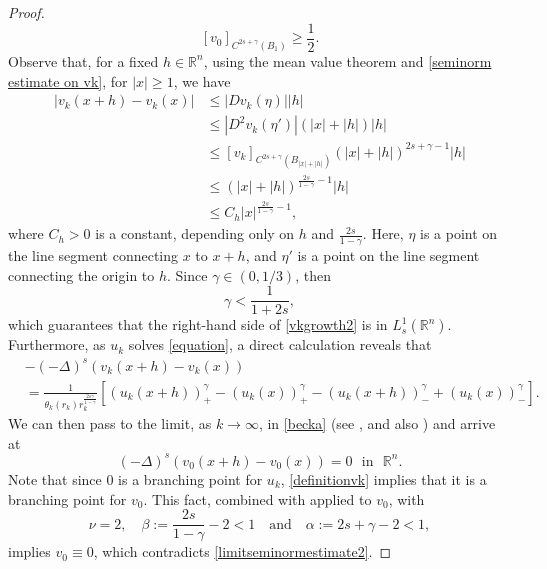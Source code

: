 \documentclass[11pt,reqno]{amsart}
\numberwithin{equation}{section}
\numberwithin{theorem}{section}
\numberwithin{lemma}{section}
\numberwithin{corollary}{section}
\numberwithin{remark}{section}
\numberwithin{proposition}{section}
\numberwithin{definition}{section}
\newcommand{\R}{\mathbb{R}}
\begin{document}
\begin{proof}
\begin{equation}\label{limitseminormestimate2}
     \left[v_0\right]_{C^{2s+\gamma}(B_{1})}\ge\frac{1}{2}.
\end{equation}
Observe that, for a fixed $h\in\R^n$, using the mean value theorem and \eqref{seminorm estimate on vk}, for  $|x|\ge1$, we have
\begin{equation}\label{vkgrowth2}
    \begin{split}
    |v_k(x+h)-v_k(x)|&\le|Dv_k(\eta)||h|\\
    &\le|D^2v_k(\eta')|(|x|+|h|)|h|\\
    &\le[v_k]_{C^{2s+\gamma}(B_{|x|+|h|})}(|x|+|h|)^{2s+\gamma-1}|h|\\
     &\le (|x|+|h|)^{\frac{2s}{1-\gamma}-1}|h|\\
     &\le C_h|x|^{\frac{2s}{1-\gamma}-1},
    \end{split}
\end{equation}
where $C_h>0$ is a constant, depending only on $h$ and $\frac{2s}{1-\gamma}$. Here, $\eta$ is a point on the line segment connecting $x$ to $x+h$, and $\eta'$ is a point on the line segment connecting the origin to $h$. Since $\gamma\in(0,1/3)$, then
$$
\gamma<\frac{1}{1+2s},
$$
which guarantees that the right-hand side of \eqref{vkgrowth2} is in $L^1_s(\R^n)$. Furthermore, as $u_k$ solves \eqref{equation}, a direct calculation reveals that
\begin{equation}\label{becka}
\begin{split}
    &-(-\Delta)^s\left(v_k(x+h)-v_k(x)\right)\\
    &=\frac{1}{\theta_k(r_k)r_k^{\frac{2s\gamma}{1-\gamma}}}\left[\left(u_k(x+h)\right)_+^\gamma-\left(u_k(x)\right)_+^\gamma-\left(u_k(x+h)\right)_-^\gamma+\left(u_k(x)\right)_-^\gamma\right].
\end{split}
\end{equation}
We can then pass to the limit, as $k\to\infty$, in \eqref{becka} (see \cite[Lemma 5]{CS11}, and also \cite[Lemma 4.5 and Corollary 4.7]{CS09}) and arrive at
\begin{equation*}\label{limit equation}
    (-\Delta)^s(v_0(x+h)-v_0(x))=0\,\,\mbox{ in }\,\,\R^n.
\end{equation*}
Note that since $0$ is a branching point for $u_k$, \eqref{definitionvk} implies that it is a branching point for $v_0$. This fact, combined with  applied to $v_0$, with 
    $$
    \nu=2, \quad \beta:=\frac{2s}{1-\gamma}-2<1 \quad \text{and} \quad \alpha:=2s+\gamma-2<1,
    $$ 
    implies $v_0\equiv0$, which contradicts \eqref{limitseminormestimate2}.
\end{proof}
\end{document}
